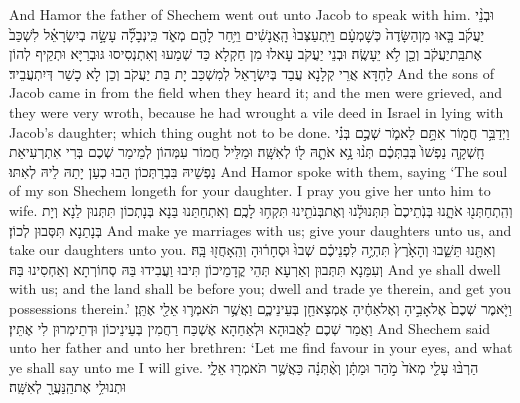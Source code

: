 {And Hamor the father of Shechem went out unto Jacob to speak with him.}{}
{וּבְנֵ֨י יַעֲקֹ֜ב בָּ֤אוּ מִן\maqqaf הַשָּׂדֶה֙ כְּשׇׁמְעָ֔ם וַיִּֽתְעַצְּבוּ֙ הָֽאֲנָשִׁ֔ים וַיִּ֥חַר לָהֶ֖ם מְאֹ֑ד כִּֽי\maqqaf נְבָלָ֞ה עָשָׂ֣ה בְיִשְׂרָאֵ֗ל לִשְׁכַּב֙ אֶת\maqqaf בַּֽת\maqqaf יַעֲקֹ֔ב וְכֵ֖ן לֹ֥א יֵעָשֶֽׂה׃}
{וּבְנֵי יַעֲקֹב עָאלוּ מִן חַקְלָא כַּד שְׁמַעוּ וְאִתְנְסִיסוּ גּוּבְרַיָּא וּתְקֵיף לְהוֹן לַחְדָּא אֲרֵי קְלָנָא עֲבַד בְּיִשְׂרָאֵל לְמִשְׁכַּב יָת בַּת יַעֲקֹב וְכֵן לָא כָשַׁר דְּיִתְעֲבֵיד׃}
{And the sons of Jacob came in from the field when they heard it; and the men were grieved, and they were very wroth, because he had wrought a vile deed in Israel in lying with Jacob’s daughter; which thing ought not to be done.}{}
{וַיְדַבֵּ֥ר חֲמ֖וֹר אִתָּ֣ם לֵאמֹ֑ר שְׁכֶ֣ם בְּנִ֗י חָֽשְׁקָ֤ה נַפְשׁוֹ֙ בְּבִתְּכֶ֔ם תְּנ֨וּ נָ֥א אֹתָ֛הּ ל֖וֹ לְאִשָּֽׁה׃}
{וּמַלֵּיל חֲמוֹר עִמְּהוֹן לְמֵימַר שְׁכֶם בְּרִי אִתְרְעִיאַת נַפְשֵׁיהּ בִּבְרַתְּכוֹן הַבוּ כְעַן יָתַהּ לֵיהּ לְאִתּוּ׃}
{And Hamor spoke with them, saying ‘The soul of my son Shechem longeth for your daughter. I pray you give her unto him to wife.}{}
{וְהִֽתְחַתְּנ֖וּ אֹתָ֑נוּ בְּנֹֽתֵיכֶם֙ תִּתְּנוּ\maqqaf לָ֔נוּ וְאֶת\maqqaf בְּנֹתֵ֖ינוּ תִּקְח֥וּ לָכֶֽם׃}
{וְאִתְחַתַּנוּ בַּנָא בְּנָתְכוֹן תִּתְּנוּן לַנָא וְיָת בְּנָתַנָא תִּסְּבוּן לְכוֹן׃}
{And make ye marriages with us; give your daughters unto us, and take our daughters unto you.}{}
{וְאִתָּ֖נוּ תֵּשֵׁ֑בוּ וְהָאָ֙רֶץ֙ תִּהְיֶ֣ה לִפְנֵיכֶ֔ם שְׁבוּ֙ וּסְחָר֔וּהָ וְהֵֽאָחֲז֖וּ בָּֽהּ׃}
{וְעִמַּנָא תִּתְּבוּן וְאַרְעָא תְּהֵי קֳדָמֵיכוֹן תִּיבוּ וַעֲבִידוּ בַּהּ סְחוֹרְתָא וְאַחְסִינוּ בַּהּ׃}
{And ye shall dwell with us; and the land shall be before you; dwell and trade ye therein, and get you possessions therein.’}{}
{וַיֹּ֤אמֶר שְׁכֶם֙ אֶל\maqqaf אָבִ֣יהָ וְאֶל\maqqaf אַחֶ֔יהָ אֶמְצָא\maqqaf חֵ֖ן בְּעֵינֵיכֶ֑ם וַאֲשֶׁ֥ר תֹּאמְר֛וּ אֵלַ֖י אֶתֵּֽן׃}
{וַאֲמַר שְׁכֶם לַאֲבוּהָא וּלְאַחַהָא אֶשְׁכַּח רַחֲמִין בְּעֵינֵיכוֹן וּדְתֵימְרוּן לִי אֶתֵּין׃}
{And Shechem said unto her father and unto her brethren: ‘Let me find favour in your eyes, and what ye shall say unto me I will give.}{}
{הַרְבּ֨וּ עָלַ֤י מְאֹד֙ מֹ֣הַר וּמַתָּ֔ן וְאֶ֨תְּנָ֔ה כַּאֲשֶׁ֥ר תֹּאמְר֖וּ אֵלָ֑י וּתְנוּ\maqqaf לִ֥י אֶת\maqqaf הַֽנַּעֲרָ֖ לְאִשָּֽׁה׃}
